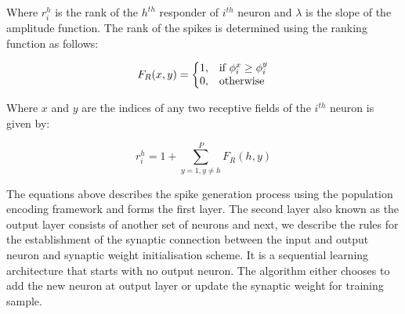 Where $r_i^h$ is the rank of the $h^{th}$ responder of $i^{th}$ neuron and $\lambda$ is the slope of the amplitude function. The rank of the spikes is determined using the ranking function as follows:


\begin{equation}
	F_R(x, y)=\left\{
	\begin{array}{@{}ll@{}}
	1, & \text{if}\ \phi_i^x\geq \phi_i^y \\
	0, & \text{otherwise}
	\end{array}\right.
\end{equation}

Where $x$ and $y$ are the indices of any two receptive fields of the $i^{th}$ neuron is given by:

\begin{equation}
	r_i^h=1+\sum_{y=1, y\neq h}^P F_R(h,y)
\end{equation}

The equations above describes the spike generation process using the population encoding framework and forms the first layer. The second layer also known as the output layer consists of another set of neurons and next, we describe the rules for the establishment of the synaptic connection between the input and output neuron and synaptic weight initialisation scheme. It is a sequential learning architecture that starts with no output neuron. The algorithm either chooses to add the new neuron at output layer or update the synaptic weight for training sample. 

